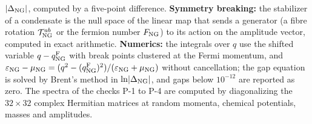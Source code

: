 \documentclass[
  10pt,
]{article}
\begin{document}
\(\lvert\Delta_{\rm NG}\rvert\), computed by a five-point difference.
\textbf{Symmetry breaking:} the stabilizer of a condensate is the null
space of the linear map that sends a generator (a fibre rotation
\(\mathcal T^{ab}_{\rm NG}\) or the fermion number \(F_{\rm NG}\)) to
its action on the amplitude vector, computed in exact arithmetic.
\textbf{Numerics:} the integrals over \(q\) use the shifted variable
\(q-q^{\rm F}_{\rm NG}\) with break points clustered at the Fermi
momentum, and
\(\varepsilon_{\rm NG}-\mu_{\rm NG}=(q^2-(q^{\rm F}_{\rm NG})^2)/(\varepsilon_{\rm NG}+\mu_{\rm NG})\)
without cancellation; the gap equation is solved by Brent's method in
\(\ln\lvert\Delta_{\rm NG}\rvert\), and gaps below \(10^{-12}\) are
reported as zero. The spectra of the checks P-1 to P-4 are computed by
diagonalizing the \(32\times32\) complex Hermitian matrices at random
momenta, chemical potentials, masses and amplitudes.
\end{document}
